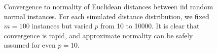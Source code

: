 \documentclass[10pt,letterpaper]{article}\usepackage[]{graphicx}\usepackage[]{color}
\begin{document}
\begin{figure}[ht!]
\centering
		\caption{Convergence to normality of Euclidean distances between iid random normal instances. For each simulated distance distribution, we fixed $m=100$ instances but varied $p$ from 10 to 10000. It is clear that convergence is rapid, and approximate normality can be safely assumed for even $p=10$.}\label{fig:euclideanConverge}
\end{figure}
\end{document}
